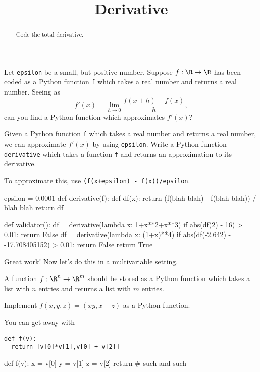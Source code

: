 \documentclass{ximera}
\title{Derivative}
\begin{document}
\begin{abstract}
  Code the total derivative.
\end{abstract}\maketitle

\begin{exercise}
  Let \texttt{epsilon} be a small, but positive number.  Suppose $f:\R
  \to \R$ has been coded as a Python function \texttt{f} which takes a
  real number and returns a real number.  Seeing as
  $$
  f'(x) = \lim_{h \to 0} \frac{f(x+h) - f(x)}{h},
  $$
  can you find a Python function which approximates $f'(x)$?

  Given a Python function \texttt{f} which takes a real number and
  returns a real number, we can approximate $f'(x)$ by using
  \texttt{epsilon}.  Write a Python function \texttt{derivative} which
  takes a function \texttt{f} and returns an approximation to its
  derivative.

\begin{solution}
  \begin{hint}
    To approximate this, use \texttt{(f(x+epsilon) - f(x))/epsilon}.
  \end{hint}
\begin{python}
epsilon = 0.0001
def derivative(f):
  def df(x): return (f(blah blah) - f(blah blah)) / blah blah
  return df


def validator():
  df = derivative(lambda x: 1+x**2+x**3)
  if abs(df(2) - 16) > 0.01:
    return False
  df = derivative(lambda x: (1+x)**4)
  if abs(df(-2.642) - -17.708405152) > 0.01:
    return False
  return True
\end{python}
\end{solution}

  Great work!  Now let's do this in a multivariable setting.

  A function $f:\R^n \to \R^m$ should be stored as a Python function
  which takes a list with $n$ entries and returns a list with $m$
  entries.  
  \begin{solution}
    Implement $f(x,y,z) = (xy,x+z)$ as a Python function.
    \begin{hint}
You can get away with
\begin{verbatim}
def f(v):
  return [v[0]*v[1],v[0] + v[2]]
\end{verbatim}
    \end{hint}
    \begin{python}
def f(v):
  x = v[0]
  y = v[1]
  z = v[2]
  return # such and such


\end{python}
\end{solution}
\end{exercise}
\end{document}

